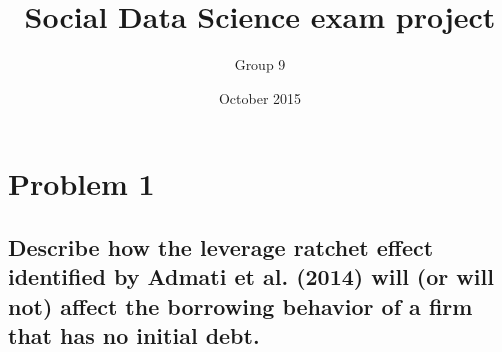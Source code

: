 \documentclass[12pt]{article}
\title{Social Data Science exam project}
\author{Group 9}
\date{October 2015}
\begin{document}
\maketitle

	\section{Problem 1} %
	\label{sec:problem_1}

	\subsection{Describe how the leverage ratchet effect identified by Admati et al. (2014) will (or will not) affect the borrowing behavior of a firm that has no initial debt.} %
\end{document}
